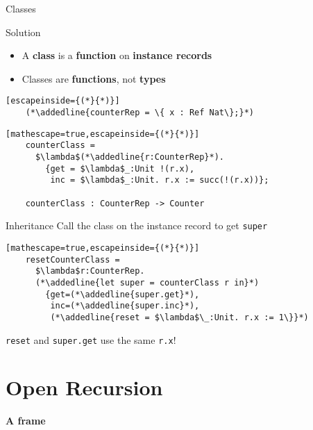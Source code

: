 \documentclass[presentation,xcolor=svgnames]{beamer}
\begin{document}
\begin{frame}[fragile]{Classes}
  \begin{block}{Solution}
    \begin{itemize}
    \item A \textbf{class} is a \textbf{function} on \textbf{instance records}
    \item Classes are \textbf{functions}, not \textbf{types}
    \end{itemize}
  \end{block}
  \begin{lstlisting}[escapeinside={(*}{*)}]
    (*\addedline{counterRep = \{ x : Ref Nat\};}*)
  \end{lstlisting}
  \begin{lstlisting}[mathescape=true,escapeinside={(*}{*)}]
    counterClass =
      $\lambda$(*\addedline{r:CounterRep}*).
        {get = $\lambda$_:Unit !(r.x),
         inc = $\lambda$_:Unit. r.x := succ(!(r.x))};

    counterClass : CounterRep -> Counter
  \end{lstlisting}
\end{frame}

\begin{frame}[fragile]{Inheritance}
  Call the class on the instance record to get \texttt{super}

  \begin{lstlisting}[mathescape=true,escapeinside={(*}{*)}]
    resetCounterClass =
      $\lambda$r:CounterRep.
      (*\addedline{let super = counterClass r in}*)
        {get=(*\addedline{super.get}*),
         inc=(*\addedline{super.inc}*),
         (*\addedline{reset = $\lambda$\_:Unit. r.x := 1\}}*)
  \end{lstlisting}

  \begin{block}{}
  \texttt{reset} and \texttt{super.get} use the same \texttt{r.x}!
  \end{block}

\end{frame}

\section{Open Recursion}

\begin{frame}
  \centering
  \huge \textbf{A frame}
\end{frame}
\end{document}
